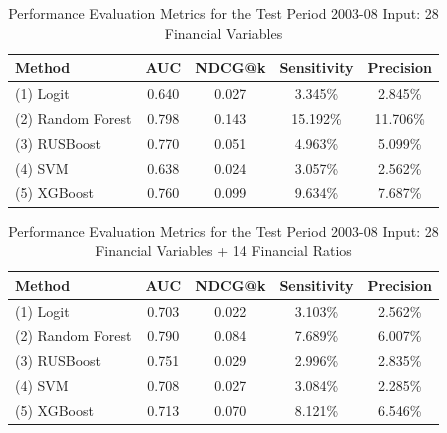 \documentclass[conference]{IEEEtran}
\begin{document}
\begin{table}[H]
\caption{Performance Evaluation Metrics for the Test Period 2003-08 \newline Input: 28 Financial Variables}
\centering
\begin{tabular}{p{2.495cm}cccc}
\toprule
\textbf{Method} & \textbf{AUC} & \textbf{NDCG@k} & \textbf{Sensitivity} & \textbf{Precision} \\
\midrule
\raggedright (1) Logit & 0.640 & 0.027 & 3.345\% & 2.845\% \\
\raggedright (2) Random Forest & 0.798 & 0.143 & 15.192\% & 11.706\% \\
\raggedright (3) RUSBoost & 0.770 & 0.051 & 4.963\% & 5.099\% \\
\raggedright (4) SVM & 0.638 & 0.024 & 3.057\% & 2.562\% \\
\raggedright (5) XGBoost & 0.760 & 0.099 & 9.634\% & 7.687\% \\
\bottomrule
\end{tabular}
\label{tab:performance}
\end{table}

\begin{table}[H]
\caption{Performance Evaluation Metrics for the Test Period 2003-08 \newline Input: 28 Financial Variables + 14 Financial Ratios}
\centering
\begin{tabular}{p{2.495cm}cccc}
\toprule
\textbf{Method} & \textbf{AUC} & \textbf{NDCG@k} & \textbf{Sensitivity} & \textbf{Precision} \\
\midrule
\raggedright (1) Logit & 0.703 & 0.022 & 3.103\% & 2.562\% \\
\raggedright (2) Random Forest & 0.790 & 0.084 & 7.689\% & 6.007\% \\
\raggedright (3) RUSBoost & 0.751 & 0.029 & 2.996\% & 2.835\% \\
\raggedright (4) SVM & 0.708 & 0.027 & 3.084\% & 2.285\% \\
\raggedright (5) XGBoost & 0.713 & 0.070 & 8.121\% & 6.546\% \\

\bottomrule
\end{tabular}
\end{table}
\end{document}
